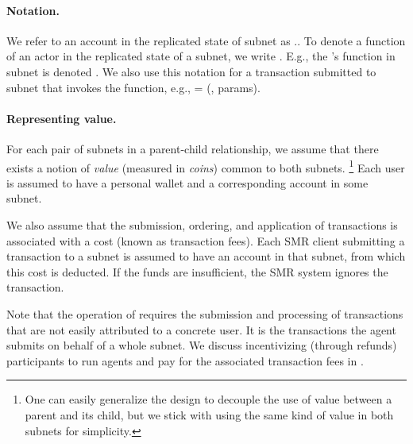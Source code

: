 \paragraph{Notation.} We refer to an account  in the replicated state of subnet  as ..
To denote a function of an actor in the replicated state of a subnet, we write .
E.g., the \gw's function  in subnet  is denoted .
We also use this notation for a transaction  submitted to subnet  that invokes the function, e.g.,  = (, params).

\paragraph{Representing value.}
For each pair of subnets in a parent-child relationship, we assume that there exists a notion of \emph{value} (measured in \emph{coins}) common to both subnets.%
\footnote{One can easily generalize the design to decouple the use of value between a parent and its child, but we stick with using the same kind of value in both subnets for simplicity.}
Each user is assumed to have a personal wallet and a corresponding account in some subnet.

We also assume that the submission, ordering, and application of transactions is associated with a cost (known as transaction fees).
Each SMR client submitting a transaction to a subnet is assumed to have an account in that subnet, from which this cost is deducted.
If the funds are insufficient, the SMR system ignores the transaction.

Note that the operation of \ipc requires the submission and processing of transactions that are not easily attributed to a concrete user.
It is the transactions the \ipc agent submits on behalf of a whole subnet.
We discuss incentivizing (through refunds) participants to run \ipc agents and pay for the associated transaction fees in .